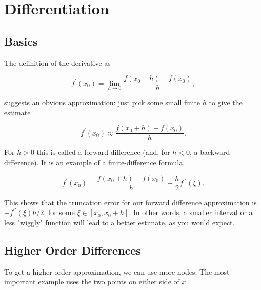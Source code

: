 \section{Differentiation}

\subsection{Basics}

\begin{definition}[Derivtaive]
  The definition of the derivative as

\[
f^{\prime}\left(x_0\right)=\lim _{h \rightarrow 0} \frac{f\left(x_0+h\right)-f\left(x_0\right)}{h},
\]

suggests an obvious approximation: just pick some small finite \(h\) to give the estimate

\[
f^{\prime}\left(x_0\right) \approx \frac{f\left(x_0+h\right)-f\left(x_0\right)}{h} .
\]
\end{definition}

\begin{definition}
  For \(h>0\) this is called a forward difference (and, for \(h<0\), a backward difference). It is an example of a finite-difference formula.
\end{definition}

\begin{remark}
  \[
f^{\prime}\left(x_0\right)=\frac{f\left(x_0+h\right)-f\left(x_0\right)}{h}-\frac{h}{2} f^{\prime \prime}(\xi) .
\]

This shows that the truncation error for our forward difference approximation is \(-f^{\prime \prime}(\xi) h / 2\), for some \(\xi \in\left[x_0, x_0+h\right]\). In other words, a smaller interval or a less "wiggly" function will lead to a better estimate, as you would expect.
\end{remark}

\subsection{Higher Order Differences}

\begin{remark}
  To get a higher-order approximation, we can use more nodes. The most important example uses the two points on either side of \(x\)
\end{remark}

